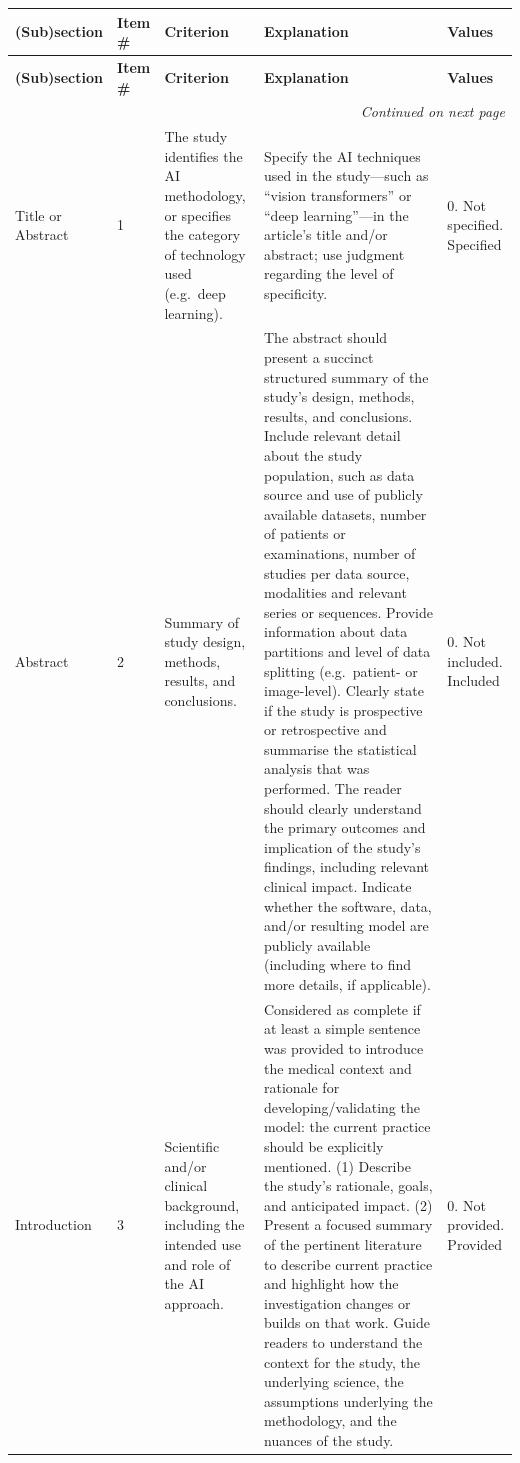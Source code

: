 \begin{landscape}
\fontsize{7pt}{8.4pt}\selectfont
\setlength{\tabcolsep}{3pt}
\begin{longtable}{@{}p{1.7cm}p{0.7cm}p{3.6cm}p{9.6cm}p{3.2cm}@{}}
	\toprule
	\textbf{(Sub)section} & \textbf{Item \#} & \textbf{Criterion} & \textbf{Explanation} & \textbf{Values} \\
	\midrule
	\endfirsthead
	\toprule
	\textbf{(Sub)section} & \textbf{Item \#} & \textbf{Criterion} & \textbf{Explanation} & \textbf{Values} \\
	\midrule
	\endhead
	\midrule
	\multicolumn{5}{r}{\emph{Continued on next page}}\\
	\endfoot
	\bottomrule
	\endlastfoot
	Title or Abstract & 1 & The study identifies the AI methodology, or specifies the category of technology used (e.g.\ deep learning). & Specify the AI techniques used in the study---such as ``vision transformers'' or ``deep learning''---in the article's title and/or abstract; use judgment regarding the level of specificity. & 0. Not specified\newline 1. Specified \\
	\addlinespace
	Abstract & 2 & Summary of study design, methods, results, and conclusions. & The abstract should present a succinct structured summary of the study's design, methods, results, and conclusions. Include relevant detail about the study population, such as data source and use of publicly available datasets, number of patients or examinations, number of studies per data source, modalities and relevant series or sequences. Provide information about data partitions and level of data splitting (e.g.\ patient- or image-level). Clearly state if the study is prospective or retrospective and summarise the statistical analysis that was performed. The reader should clearly understand the primary outcomes and implication of the study's findings, including relevant clinical impact. Indicate whether the software, data, and/or resulting model are publicly available (including where to find more details, if applicable). & 0. Not included\newline 1. Included \\
	\addlinespace
	Introduction & 3 & Scientific and/or clinical background, including the intended use and role of the AI approach. & Considered as complete if at least a simple sentence was provided to introduce the medical context and rationale for developing/validating the model: the current practice should be explicitly mentioned. (1) Describe the study's rationale, goals, and anticipated impact. (2) Present a focused summary of the pertinent literature to describe current practice and highlight how the investigation changes or builds on that work. Guide readers to understand the context for the study, the underlying science, the assumptions underlying the methodology, and the nuances of the study. & 0. Not provided\newline 1. Provided \\

\end{longtable}
\end{landscape}

